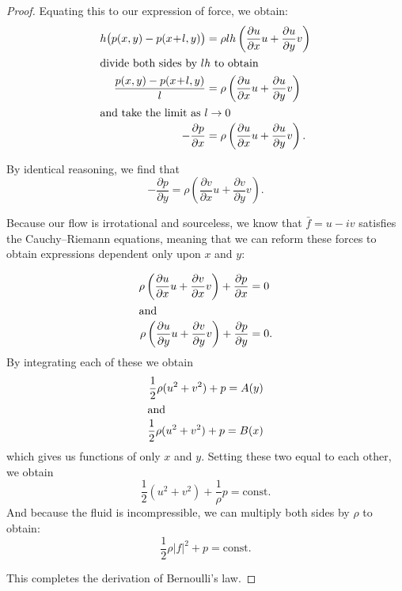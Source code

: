 \documentclass[letterpaper, twoside, 12 pt]{article}
\begin{document}
\begin{proof}
		Equating this to our expression of force, we obtain:
		\begin{align*}
			h \big( p(x, y) - p(x \!+\! l, y) \big) &= \rho lh \left( \frac{\partial u}{\partial x} u + \frac{\partial u}{\partial y} v \right)\\
			\intertext{divide both sides by $lh$ to obtain}
			\frac{p(x, y) - p(x \!+\! l, y)}{l} &= \rho \left( \frac{\partial u}{\partial x} u + \frac{\partial u}{\partial y} v \right) \\
			\intertext{and take the limit as $l \to 0$}
			- \frac{\partial p}{\partial x} &= \rho \left( \frac{\partial u}{\partial x} u + \frac{\partial u}{\partial y} v \right).
		\end{align*}
		
		By identical reasoning, we find that
		\[
			- \frac{\partial p}{\partial y} = \rho \left( \frac{\partial v}{\partial x} u + \frac{\partial v}{\partial y} v \right).
		\]
		
		Because our flow is irrotational and sourceless, we know that $\bar f = u - iv$ satisfies the Cauchy--Riemann equations, meaning that we can reform these forces to obtain expressions dependent only upon $x$ and $y$:

		\begin{align*}
			\rho \left( \frac{\partial u}{\partial x} u + \frac{\partial v}{\partial x} v \right) + \frac{\partial p}{\partial x} &= 0 \\
			\intertext{and}
			\rho \left( \frac{\partial u}{\partial y} u + \frac{\partial v}{\partial y} v \right) + \frac{\partial p}{\partial y} &= 0. \\
		\end{align*}
		By integrating each of these we obtain
		\begin{align*}
			\frac{1}{2} \rho (u^2 + v^2) + p = A(y) \\
			\intertext{and}
			\frac{1}{2} \rho (u^2 + v^2) + p = B(x) \\
		\end{align*}
		which gives us functions of only $x$ and $y$.
		Setting these two equal to each other, we obtain
		\[
			\frac{1}{2} (u^2 + v^2) + \frac{1}{\rho} p = \mathrm{const.}
		\]
		And because the fluid is incompressible, we can multiply both sides by $\rho$ to obtain:
		\[
			\frac{1}{2} \rho |f|^2 + p = \mathrm{const.}
		\]

		This completes the derivation of Bernoulli's law.
	\end{proof}
\end{document}
